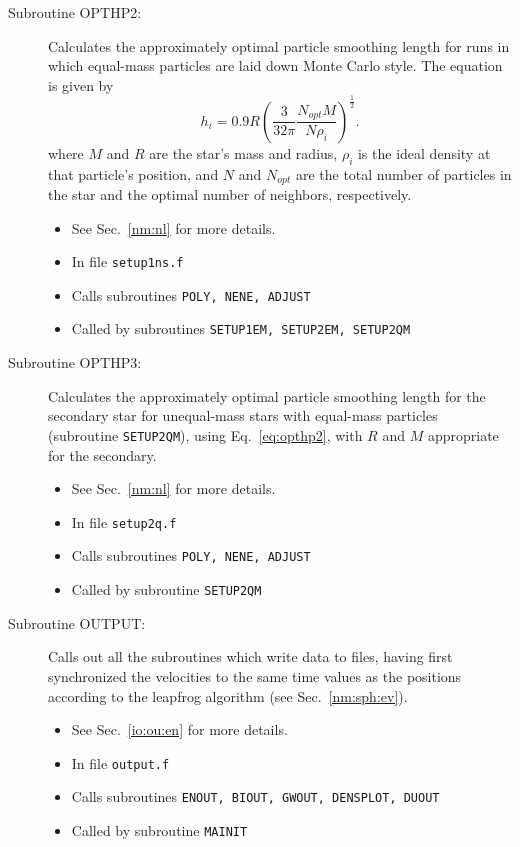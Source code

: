 \begin{description}
\item[Subroutine OPTHP2:] Calculates the approximately optimal particle
smoothing length for runs in which equal-mass particles are laid down
Monte Carlo style.  The equation is given by
\begin{equation}
h_i=0.9 R\left(\frac{3}{32\pi}\frac{N_{opt} M}{N
\rho_i}\right)^{\frac{1}{2}}. \label{eq:opthp2}
\end{equation}
where $M$ and $R$ are the star's mass and radius, $\rho_i$ is the
ideal density at that particle's position, and $N$ and $N_{opt}$ are
the total number of particles in the star and the optimal number of
neighbors, respectively. 
\begin{itemize} 
\item See Sec.~\ref{nm:nl} for more details.
\item In file {\tt setup1ns.f}
\item Calls subroutines {\tt POLY, NENE, ADJUST}
\item Called by subroutines {\tt SETUP1EM, SETUP2EM, SETUP2QM}
\end{itemize}

\item[Subroutine OPTHP3:]  Calculates the approximately optimal particle
smoothing length for the secondary star for unequal-mass stars with
equal-mass particles (subroutine {\tt SETUP2QM}), using
Eq.~\ref{eq:opthp2}, with $R$ and $M$ appropriate for the secondary.
\begin{itemize} 
\item See Sec.~\ref{nm:nl} for more details.
\item In file {\tt setup2q.f}
\item Calls subroutines {\tt POLY, NENE, ADJUST}
\item Called by subroutine {\tt SETUP2QM}
\end{itemize}

\item[Subroutine OUTPUT:] Calls out all the subroutines which write
data to files, having first synchronized the velocities to the same
time values as the positions according to the leapfrog algorithm (see
Sec.~\ref{nm:sph:ev}).
\begin{itemize} 
\item See Sec.~\ref{io:ou:en} for more details.
\item In file {\tt output.f}
\item Calls subroutines {\tt ENOUT, BIOUT, GWOUT, DENSPLOT, DUOUT}
\item Called by subroutine {\tt MAINIT}
\end{itemize}


\end{description}
